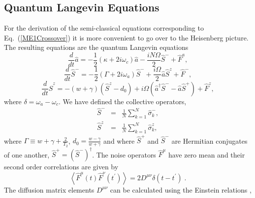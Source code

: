 \documentclass[aps,
twocolumn,
showpacs,
superscriptaddress,groupedaddress]{revtex4}
\begin{document}
\fi

\subsection{Quantum Langevin Equations}

For the derivation of the semi-classical equations corresponding to 
Eq.~(\ref{ME1Crossover}) it is more convenient to go over to the
Heisenberg picture.  The resulting equations are the quantum Langevin
equations
\begin{equation}
\frac{d}{dt} \hat{a}= -\frac{1}{2} (\kappa +2i\omega_c) \hat{a}
-\frac{i N \Omega}{2} \hat{S}^{-}
+\hat{F}^{a},
\label{La}
\end{equation}
\begin{equation}
\frac{d}{dt} \hat{S}^{-} =
-\frac{1}{2} \left(\Gamma +2 i \omega_a \right)  \hat{S}^{-}
+\frac{i \Omega}{2} \hat{a} \hat{S}^{z}
+\hat{F}^{-},
\label{Lsm}
\end{equation}
\begin{equation}
\frac{d}{dt} \hat{S}^{z} =
-(w+\gamma)\left( \hat{S}^{z} - d_0\right)
+i\Omega \left( \hat{a}^{\dagger}\hat{S}^{-} -
\hat{a}\hat{S}^{+} \right)
+\hat{F}^{z},
\label{Lsz}
\end{equation}
where $\delta=\omega_{a}-\omega_{c}$. We have defined the collective
operators,
\begin{eqnarray}
\hat{S}^{-}&=&\frac{1}{N}\sum_{k=1}^N \hat{\sigma}_k^{-},
\nonumber
\\
\hat{S}^{z}&=&\frac{1}{N}\sum_{k=1}^N \hat{\sigma}_k^{z},
\nonumber
\end{eqnarray}
where $\Gamma \equiv w+\gamma+\frac{2}{T_2}$, $d_0 =
\frac{w-\gamma}{w+\gamma}$ and where $\hat{S}^{+}$ and $\hat{S}^{-}$ are
Hermitian conjugates of one another, $\hat{S}^{+} =
(\hat{S}^{-})^{\dagger}$. The noise operators $\hat F^\mu$ have zero
mean and their second order correlations are given by
\begin{equation}
\left< \hat{F}^{\mu}(t) \hat{F}^{\nu}(t^{\prime})\right> =
2 D^{\mu \nu} \delta(t-t^{\prime})\;.
\end{equation}
The diffusion matrix elements $D^{\mu \nu} $ can be calculated using the
Einstein relations \cite{meystre2007elements},
\end{document}
